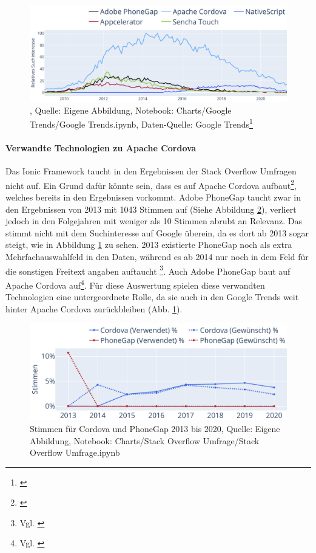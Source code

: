 \begin{figure}[H]
	\centering
    \includegraphics[width=1.0\textwidth]{Charts/Google Trends/Suchinteresse geringe Relevanz.pdf}
	\caption[]{, Quelle: Eigene Abbildung, Notebook: Charts/Google Trends/Google Trends.ipynb, Daten-Quelle: Google Trends\footnote{\cite{FaqPhoneGapDocs}}}
	\label{fig:SuchinteresseGeringeRelevanz}
\end{figure}


\paragraph{Verwandte Technologien zu Apache Cordova} Das Ionic Framework taucht in den Ergebnissen der Stack Overflow Umfragen nicht auf. Ein Grund dafür könnte sein, dass es auf Apache Cordova aufbaut\footnote{\cite{TheLastWordOnCordovaAndPhoneGap}}, welches bereits in den Ergebnissen vorkommt. Adobe PhoneGap taucht zwar in den Ergebnissen von 2013 mit 1043 Stimmen auf (Siehe Abbildung \ref{fig:CordovaUndPhoneGapStimmen}), verliert jedoch in den Folgejahren mit weniger als 10 Stimmen abrubt an Relevanz.  Das stimmt nicht mit dem Suchinteresse auf Google überein, da es dort ab 2013 sogar steigt, wie in Abbildung \ref{fig:SuchinteresseGeringeRelevanz} zu sehen. 2013 existierte PhoneGap noch als extra Mehrfachauswahlfeld in den Daten, während es ab 2014 nur noch in dem Feld für die sonstigen Freitext angaben auftaucht \footnote{Vgl. \cite{StackOverflowInsights}}. Auch Adobe PhoneGap baut auf Apache Cordova auf\footnote{Vgl. \cite{FaqPhoneGapDocs}}. Für diese Auswertung spielen diese verwandten Technologien eine untergeordnete Rolle, da sie auch in den Google Trends weit hinter Apache Cordova zurückbleiben (Abb. \ref{fig:SuchinteresseGeringeRelevanz}).
 
\begin{figure}[H]
	\centering
    \includegraphics[width=1.0\textwidth]{Charts/Stack Overflow Umfrage/Cordova und PhoneGap Stimmen.pdf}
	\caption[Stimmen für Cordova und PhoneGap 2013 bis 2020]{Stimmen für Cordova und PhoneGap 2013 bis 2020, Quelle: Eigene Abbildung, Notebook: Charts/Stack Overflow Umfrage/Stack Overflow Umfrage.ipynb}
	\label{fig:CordovaUndPhoneGapStimmen}
\end{figure}
 
